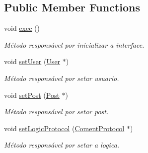 \subsection*{Public Member Functions}
\begin{DoxyCompactItemize}
\item 
\hypertarget{class_coment_controler_a3717c8a74f5091b6af228388b15f8259}{void \hyperlink{class_coment_controler_a3717c8a74f5091b6af228388b15f8259}{exec} ()}\label{class_coment_controler_a3717c8a74f5091b6af228388b15f8259}

\begin{DoxyCompactList}\small\item\em Método responsável por inicializar a interface. \end{DoxyCompactList}\item 
\hypertarget{class_coment_controler_a6438b12dbad045d3437978e6fd875159}{void \hyperlink{class_coment_controler_a6438b12dbad045d3437978e6fd875159}{set\-User} (\hyperlink{class_user}{User} $\ast$)}\label{class_coment_controler_a6438b12dbad045d3437978e6fd875159}

\begin{DoxyCompactList}\small\item\em Método responsável por setar usuario. \end{DoxyCompactList}\item 
\hypertarget{class_coment_controler_a24dea8665cd60a397c83527f0b179210}{void \hyperlink{class_coment_controler_a24dea8665cd60a397c83527f0b179210}{set\-Post} (\hyperlink{class_post}{Post} $\ast$)}\label{class_coment_controler_a24dea8665cd60a397c83527f0b179210}

\begin{DoxyCompactList}\small\item\em Método responsável por setar post. \end{DoxyCompactList}\item 
\hypertarget{class_coment_controler_a297cdd6c8e43c69d092d78f2db56645a}{void \hyperlink{class_coment_controler_a297cdd6c8e43c69d092d78f2db56645a}{set\-Logic\-Protocol} (\hyperlink{class_coment_protocol}{Coment\-Protocol} $\ast$)}\label{class_coment_controler_a297cdd6c8e43c69d092d78f2db56645a}

\begin{DoxyCompactList}\small\item\em Método responsável por setar a logica. \end{DoxyCompactList}\end{DoxyCompactItemize}


